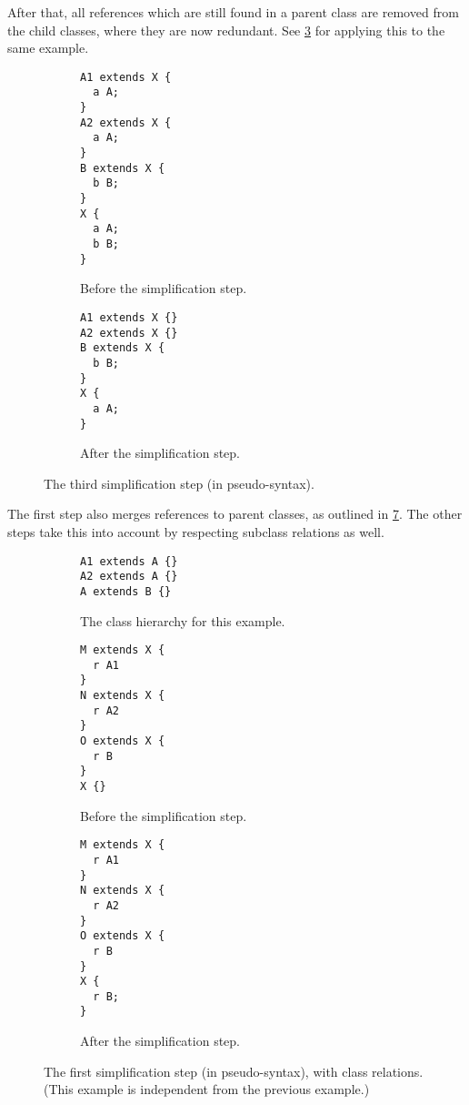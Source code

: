 After that, all references which are still found in a parent class
are removed from the child classes, where they are now redundant.
See \cref{fig:simplify-7.4.4} for applying this to the same example.

\begin{figure}[h]
  \begin{subfigure}[t]{0.45\textwidth}
    \begin{lstlisting}
A1 extends X {
  a A;
}
A2 extends X {
  a A;
}
B extends X {
  b B;
}
X {
  a A;
  b B;
}
    \end{lstlisting}
    \caption{Before the simplification step.}
    \label{fig:simplify-7.4.4-before}
  \end{subfigure}
  \begin{subfigure}[t]{0.45\textwidth}
    \begin{lstlisting}
A1 extends X {}
A2 extends X {}
B extends X {
  b B;
}
X {
  a A;
}
    \end{lstlisting}
    \caption{After the simplification step.}
    \label{fig:simplify-7.4.4-after}
  \end{subfigure}
  \caption{The third simplification step (in pseudo-syntax).}
  \label{fig:simplify-7.4.4}
\end{figure}

The first step also merges references to parent classes,
as outlined in \cref{fig:simplify-7.4.2-classes}.
The other steps take this into account by respecting subclass relations as well.

\begin{figure}[h]
  \begin{subfigure}[t]{0.3\textwidth}
    \begin{lstlisting}
A1 extends A {}
A2 extends A {}
A extends B {}
    \end{lstlisting}
    \caption{The class hierarchy for this example.}
    \label{fig:simplify-7.4.2-classes-hierarchy}
  \end{subfigure}
  \begin{subfigure}[t]{0.3\textwidth}
    \begin{lstlisting}
M extends X {
  r A1
}
N extends X {
  r A2
}
O extends X {
  r B
}
X {}
    \end{lstlisting}
    \caption{Before the simplification step.}
    \label{fig:simplify-7.4.2-classes-before}
  \end{subfigure}
  \begin{subfigure}[t]{0.3\textwidth}
    \begin{lstlisting}
M extends X {
  r A1
}
N extends X {
  r A2
}
O extends X {
  r B
}
X {
  r B;
}
    \end{lstlisting}
    \caption{After the simplification step.}
    \label{fig:simplify-7.4.2-classes-after}
  \end{subfigure}
  \caption{
    The first simplification step (in pseudo-syntax), with class relations.
    (This example is independent from the previous example.)
  }
  \label{fig:simplify-7.4.2-classes}
\end{figure}

